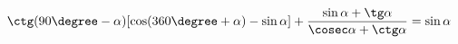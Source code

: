 \begin{ex}[type=prove_identity]
	\begin{condition}
		\(\ctg(90\degree-\alpha)[\cos(360\degree+\alpha)-\sin\alpha]+\dfrac{\sin\alpha+\tg\alpha}{\cosec\alpha+\ctg\alpha}=\sin\alpha \)
	\end{condition}
\end{ex}